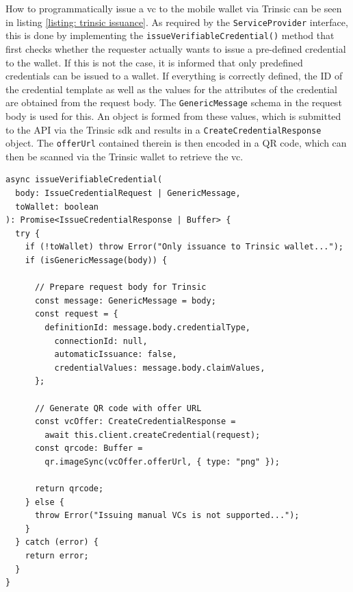     How to programmatically issue a \ac{vc} to the mobile wallet via Trinsic can be seen in listing \ref{listing: trinsic issuance}. As required by the \texttt{ServiceProvider} interface, this is done by implementing the \texttt{issueVerifiableCredential()} method that first checks whether the requester actually wants to issue a pre-defined credential to the wallet. If this is not the case, it is informed that only predefined credentials can be issued to a wallet. If everything is correctly defined, the ID of the credential template as well as the values for the attributes of the credential are obtained from the request body. The \texttt{GenericMessage} schema in the request body is used for this. An object is formed from these values, which is submitted to the API via the Trinsic \ac{sdk} and results in a \texttt{CreateCredentialResponse} object. The \texttt{offerUrl} contained therein is then encoded in a QR code, which can then be scanned via the Trinsic wallet to retrieve the \ac{vc}. 
    \newline
    
    \begin{lstlisting}[style=ES6, caption=\acs{vc} issuance with Trinsic, label={listing: trinsic issuance}]
async issueVerifiableCredential(
  body: IssueCredentialRequest | GenericMessage,
  toWallet: boolean
): Promise<IssueCredentialResponse | Buffer> {
  try {
    if (!toWallet) throw Error("Only issuance to Trinsic wallet...");
    if (isGenericMessage(body)) {
    
      // Prepare request body for Trinsic
      const message: GenericMessage = body;
      const request = {
        definitionId: message.body.credentialType,
          connectionId: null,
          automaticIssuance: false,
          credentialValues: message.body.claimValues,
      };
      
      // Generate QR code with offer URL
      const vcOffer: CreateCredentialResponse = 
        await this.client.createCredential(request);
      const qrcode: Buffer = 
        qr.imageSync(vcOffer.offerUrl, { type: "png" });
        
      return qrcode;
    } else {
      throw Error("Issuing manual VCs is not supported...");
    }
  } catch (error) {
    return error;
  }
}\end{lstlisting}

